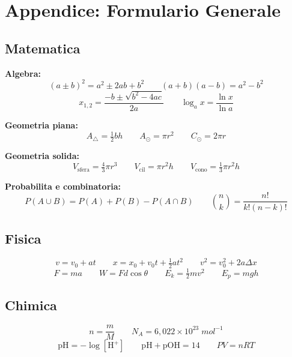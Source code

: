 \documentclass[12pt, a4paper, twoside, openright]{book}
\theoremstyle{definition}
\begin{document}
\backmatter

\chapter*{Appendice: Formulario Generale}

\section*{Matematica}

\begin{formulario}
\textbf{Algebra:}
\[
(a\pm b)^2 = a^2 \pm 2ab + b^2 \qquad (a+b)(a-b)=a^2-b^2
\]
\[
x_{1,2} = \frac{-b\pm\sqrt{b^2-4ac}}{2a} \qquad \log_a x = \frac{\ln x}{\ln a}
\]

\textbf{Geometria piana:}
\[
A_\triangle = \tfrac{1}{2}bh \qquad A_\odot = \pi r^2 \qquad C_\odot = 2\pi r
\]

\textbf{Geometria solida:}
\[
V_\text{sfera} = \tfrac{4}{3}\pi r^3 \qquad V_\text{cil} = \pi r^2 h \qquad V_\text{cono} = \tfrac{1}{3}\pi r^2 h
\]

\textbf{Probabilita e combinatoria:}
\[
P(A\cup B) = P(A)+P(B)-P(A\cap B) \qquad \binom{n}{k}=\frac{n!}{k!(n-k)!}
\]
\end{formulario}

\section*{Fisica}

\begin{formulario}
\[
v = v_0 + at \qquad x = x_0 + v_0 t + \tfrac{1}{2}at^2 \qquad v^2 = v_0^2 + 2a\Delta x
\]
\[
F = ma \qquad W = Fd\cos\theta \qquad E_k = \tfrac{1}{2}mv^2 \qquad E_p = mgh
\]
\end{formulario}

\section*{Chimica}

\begin{formulario}
\[
n = \frac{m}{M} \qquad N_A = 6{,}022\times10^{23}\;\si{mol^{-1}}
\]
\[
\mathrm{pH} = -\log[\mathrm{H^+}] \qquad \mathrm{pH}+\mathrm{pOH}=14 \qquad PV = nRT
\]
\end{formulario}
\end{document}
